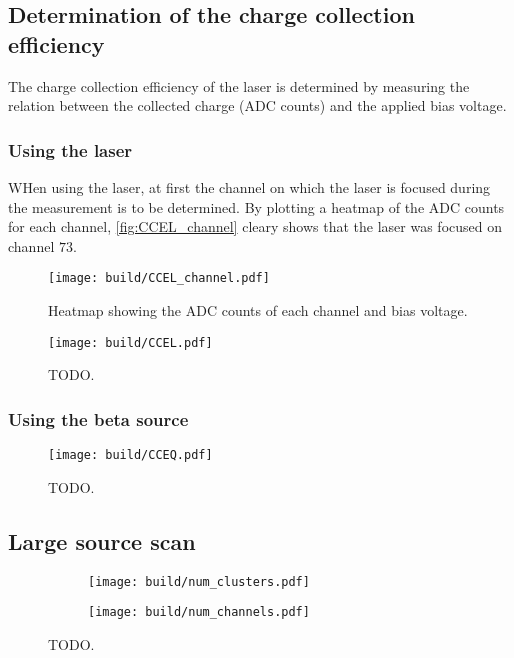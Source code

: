 \subsection{Determination of the charge collection efficiency}

The charge collection efficiency of the laser is determined by measuring the relation between the
collected charge (ADC counts) and the applied bias voltage.

\subsubsection{Using the laser}

WHen using the laser, at first the channel on which the laser is focused during the measurement is to
be determined. By plotting a heatmap of the ADC counts for each channel, \autoref{fig:CCEL_channel}
cleary shows that the laser was focused on channel $73$.

\begin{figure}[H]
  \centering
  \texttt{[image: build/CCEL\_channel.pdf]}
  \caption{Heatmap showing the ADC counts of each channel and bias voltage.}
  \label{fig:CCEL_channel}
\end{figure}

\begin{figure}[H]
  \centering
  \texttt{[image: build/CCEL.pdf]}
  \caption{TODO.}
  \label{fig:CCEL}
\end{figure}

\subsubsection{Using the beta source}

\begin{figure}[H]
  \centering
  \texttt{[image: build/CCEQ.pdf]}
  \caption{TODO.}
  \label{fig:CCEQ}
\end{figure}

\subsection{Large source scan}

\begin{figure}[H]
  \centering
    \begin{subfigure}{0.5\textwidth}
      \texttt{[image: build/num\_clusters.pdf]}
    \end{subfigure}
    \begin{subfigure}{0.5\textwidth}
      \texttt{[image: build/num\_channels.pdf]}
    \end{subfigure}
  \caption{TODO.}
  \label{fig:RS_histograms}
\end{figure}

